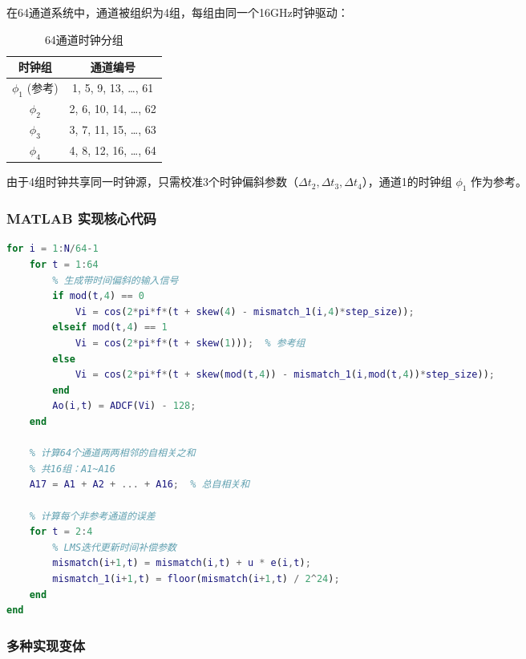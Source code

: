 \documentclass[UTF8,a4paper,11pt]{ctexart}
\begin{document}
在64通道系统中，通道被组织为4组，每组由同一个16GHz时钟驱动：

\begin{table}[ht]
\centering
\caption{64通道时钟分组}
\begin{tabular}{cc}
\toprule
\textbf{时钟组} & \textbf{通道编号} \\
\midrule
$\phi_1$ (参考) & 1, 5, 9, 13, \dots, 61 \\
$\phi_2$ & 2, 6, 10, 14, \dots, 62 \\
$\phi_3$ & 3, 7, 11, 15, \dots, 63 \\
$\phi_4$ & 4, 8, 12, 16, \dots, 64 \\
\bottomrule
\end{tabular}
\end{table}

由于4组时钟共享同一时钟源，只需校准3个时钟偏斜参数（$\Delta t_2, \Delta t_3, \Delta t_4$），通道1的时钟组 $\phi_1$ 作为参考。

\subsubsection{MATLAB 实现核心代码}

\begin{lstlisting}[language=Matlab, caption={Timing Skew校准核心迭代}]
for i = 1:N/64-1
    for t = 1:64
        % 生成带时间偏斜的输入信号
        if mod(t,4) == 0
            Vi = cos(2*pi*f*(t + skew(4) - mismatch_1(i,4)*step_size));
        elseif mod(t,4) == 1
            Vi = cos(2*pi*f*(t + skew(1)));  % 参考组
        else
            Vi = cos(2*pi*f*(t + skew(mod(t,4)) - mismatch_1(i,mod(t,4))*step_size));
        end
        Ao(i,t) = ADCF(Vi) - 128;
    end
    
    % 计算64个通道两两相邻的自相关之和
    % 共16组：A1~A16
    A17 = A1 + A2 + ... + A16;  % 总自相关和
    
    % 计算每个非参考通道的误差
    for t = 2:4
        % LMS迭代更新时间补偿参数
        mismatch(i+1,t) = mismatch(i,t) + u * e(i,t);
        mismatch_1(i+1,t) = floor(mismatch(i+1,t) / 2^24);
    end
end
\end{lstlisting}

\subsubsection{多种实现变体}
\end{document}
